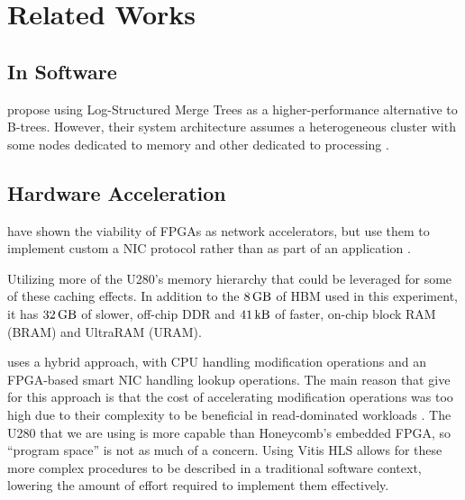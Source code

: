 \section{Related Works}

\subsection{In Software}

\citeauthor{dlsm} propose using Log-Structured Merge Trees as a higher-performance alternative to B-trees. However, their system architecture assumes a heterogeneous cluster with some nodes dedicated to memory and other dedicated to processing \autocite{dlsm}.


\subsection{Hardware Acceleration}

\citeauthor{star} have shown the viability of FPGAs as network accelerators, but use them to implement custom a NIC protocol rather than as part of an application \autocite{star}.

Utilizing more of the U280's memory hierarchy that could be leveraged for some of these caching effects. In addition to the $\SI{8}{\giga\byte}$ of HBM used in this experiment, it has $\SI{32}{\giga\byte}$ of slower, off-chip DDR and $\SI{41}{\kilo\byte}$ of faster, on-chip block RAM (BRAM) and UltraRAM (URAM).

 uses a hybrid approach, with CPU handling modification operations and an FPGA-based smart NIC handling lookup operations. The main reason that \citeauthor{honeycomb} give for this approach is that the cost of accelerating modification operations was too high due to their complexity to be beneficial in read-dominated workloads \autocite{honeycomb}. The U280 that we are using is more capable than Honeycomb's embedded FPGA, so ``program space'' is not as much of a concern. Using Vitis HLS allows for these more complex procedures to be described in a traditional software context, lowering the amount of effort required to implement them effectively.

